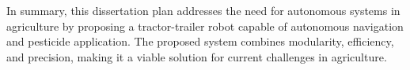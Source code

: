 In summary, this dissertation plan addresses the need for autonomous 
systems in agriculture by proposing a tractor-trailer robot capable of autonomous 
navigation and pesticide application. The proposed system combines modularity, 
efficiency, and precision, making it a viable solution for current challenges in 
agriculture.


